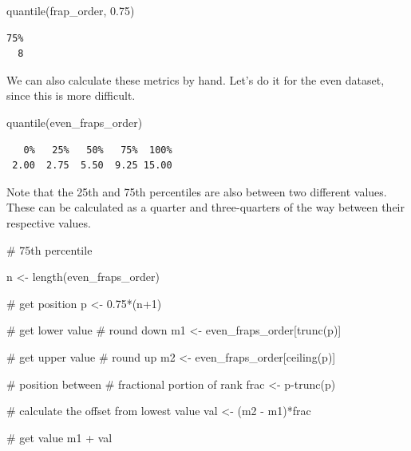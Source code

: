 \documentclass[
  letterpaper,
  DIV=11,
  numbers=noendperiod]{scrreprt}
\newenvironment{Shaded}{\begin{snugshade}}{\end{snugshade}}
\newcommand{\CommentTok}[1]{\textcolor[rgb]{0.37,0.37,0.37}{#1}}
\newcommand{\DecValTok}[1]{\textcolor[rgb]{0.68,0.00,0.00}{#1}}
\newcommand{\FloatTok}[1]{\textcolor[rgb]{0.68,0.00,0.00}{#1}}
\newcommand{\FunctionTok}[1]{\textcolor[rgb]{0.28,0.35,0.67}{#1}}
\newcommand{\NormalTok}[1]{\textcolor[rgb]{0.00,0.23,0.31}{#1}}
\newcommand{\OtherTok}[1]{\textcolor[rgb]{0.00,0.23,0.31}{#1}}
\newcommand{\SpecialCharTok}[1]{\textcolor[rgb]{0.37,0.37,0.37}{#1}}
\begin{document}
\begin{Shaded}
\begin{Highlighting}[]
\FunctionTok{quantile}\NormalTok{(frap\_order, }\FloatTok{0.75}\NormalTok{)}
\end{Highlighting}
\end{Shaded}

\begin{verbatim}
75% 
  8 
\end{verbatim}

We can also calculate these metrics by hand. Let's do it for the even
dataset, since this is more difficult.

\begin{Shaded}
\begin{Highlighting}[]
\FunctionTok{quantile}\NormalTok{(even\_fraps\_order)}
\end{Highlighting}
\end{Shaded}

\begin{verbatim}
   0%   25%   50%   75%  100% 
 2.00  2.75  5.50  9.25 15.00 
\end{verbatim}

Note that the 25th and 75th percentiles are also between two different
values. These can be calculated as a quarter and three-quarters of the
way between their respective values.

\begin{Shaded}
\begin{Highlighting}[]
\CommentTok{\# 75th percentile}

\NormalTok{n }\OtherTok{\textless{}{-}} \FunctionTok{length}\NormalTok{(even\_fraps\_order)}

\CommentTok{\# get position}
\NormalTok{p }\OtherTok{\textless{}{-}} \FloatTok{0.75}\SpecialCharTok{*}\NormalTok{(n}\SpecialCharTok{+}\DecValTok{1}\NormalTok{)}

\CommentTok{\# get lower value}
\CommentTok{\# round down}
\NormalTok{m1 }\OtherTok{\textless{}{-}}\NormalTok{ even\_fraps\_order[}\FunctionTok{trunc}\NormalTok{(p)]}

\CommentTok{\# get upper value}
\CommentTok{\# round up}
\NormalTok{m2 }\OtherTok{\textless{}{-}}\NormalTok{ even\_fraps\_order[}\FunctionTok{ceiling}\NormalTok{(p)]}

\CommentTok{\# position between}
\CommentTok{\# fractional portion of rank}
\NormalTok{frac }\OtherTok{\textless{}{-}}\NormalTok{ p}\SpecialCharTok{{-}}\FunctionTok{trunc}\NormalTok{(p)}

\CommentTok{\# calculate the offset from lowest value}
\NormalTok{val }\OtherTok{\textless{}{-}}\NormalTok{ (m2 }\SpecialCharTok{{-}}\NormalTok{ m1)}\SpecialCharTok{*}\NormalTok{frac}

\CommentTok{\# get value}
\NormalTok{m1 }\SpecialCharTok{+}\NormalTok{ val}
\end{Highlighting}
\end{Shaded}
\end{document}
